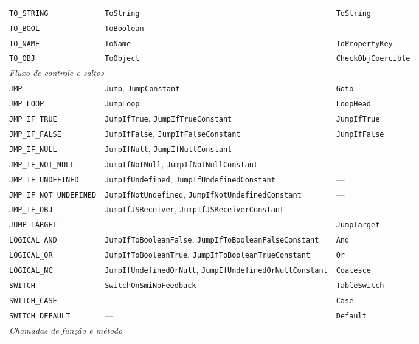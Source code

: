 {\begin{longtable}{@{}p{4.2cm}p{5.3cm}p{5.3cm}@{}}
\texttt{TO\_STRING} & \texttt{ToString} & \texttt{ToString} \\
\texttt{TO\_BOOL} & \texttt{ToBoolean} & --- \\
\texttt{TO\_NAME} & \texttt{ToName} & \texttt{ToPropertyKey} \\
\texttt{TO\_OBJ} & \texttt{ToObject} & \texttt{CheckObjCoercible} \\
\midrule
\multicolumn{3}{l}{\textit{Fluxo de controle e saltos}} \\
\midrule
\texttt{JMP} & \texttt{Jump}, \texttt{JumpConstant} & \texttt{Goto} \\
\texttt{JMP\_LOOP} & \texttt{JumpLoop} & \texttt{LoopHead} \\
\texttt{JMP\_IF\_TRUE} & \texttt{JumpIfTrue}, \texttt{JumpIfTrueConstant} & \texttt{JumpIfTrue} \\
\texttt{JMP\_IF\_FALSE} & \texttt{JumpIfFalse}, \texttt{JumpIfFalseConstant} & \texttt{JumpIfFalse} \\
\texttt{JMP\_IF\_NULL} & \texttt{JumpIfNull}, \texttt{JumpIfNullConstant} & --- \\
\texttt{JMP\_IF\_NOT\_NULL} & \texttt{JumpIfNotNull}, \texttt{JumpIfNotNullConstant} & --- \\
\texttt{JMP\_IF\_UNDEFINED} & \texttt{JumpIfUndefined}, \texttt{JumpIfUndefinedConstant} & --- \\
\texttt{JMP\_IF\_NOT\_UNDEFINED} & \texttt{JumpIfNotUndefined}, \texttt{JumpIfNotUndefinedConstant} & --- \\
\texttt{JMP\_IF\_OBJ} & \texttt{JumpIfJSReceiver}, \texttt{JumpIfJSReceiverConstant} & --- \\
\texttt{JUMP\_TARGET} & --- & \texttt{JumpTarget} \\
\texttt{LOGICAL\_AND} & \texttt{JumpIfToBooleanFalse}, \texttt{JumpIfToBooleanFalseConstant} & \texttt{And} \\
\texttt{LOGICAL\_OR} & \texttt{JumpIfToBooleanTrue}, \texttt{JumpIfToBooleanTrueConstant} & \texttt{Or} \\
\texttt{LOGICAL\_NC} & \texttt{JumpIfUndefinedOrNull}, \texttt{JumpIfUndefinedOrNullConstant} & \texttt{Coalesce} \\
\texttt{SWITCH} & \texttt{SwitchOnSmiNoFeedback} & \texttt{TableSwitch} \\
\texttt{SWITCH\_CASE} & --- & \texttt{Case} \\
\texttt{SWITCH\_DEFAULT} & --- & \texttt{Default} \\
\midrule
\multicolumn{3}{l}{\textit{Chamadas de função e método}} \\

\end{longtable}}
